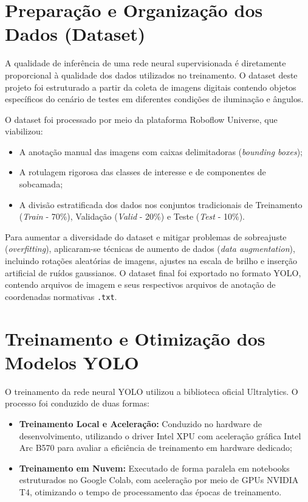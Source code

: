 \section{Preparação e Organização dos Dados (Dataset)}
A qualidade de inferência de uma rede neural supervisionada é diretamente proporcional à qualidade dos dados utilizados no treinamento. O dataset deste projeto foi estruturado a partir da coleta de imagens digitais contendo objetos específicos do cenário de testes em diferentes condições de iluminação e ângulos. 

O dataset foi processado por meio da plataforma Roboflow Universe, que viabilizou:
\begin{itemize}
    \item A anotação manual das imagens com caixas delimitadoras (\textit{bounding boxes});
    \item A rotulagem rigorosa das classes de interesse e de componentes de sobcamada;
    \item A divisão estratificada dos dados nos conjuntos tradicionais de Treinamento (\textit{Train} - 70\%), Validação (\textit{Valid} - 20\%) e Teste (\textit{Test} - 10\%).
\end{itemize}

Para aumentar a diversidade do dataset e mitigar problemas de sobreajuste (\textit{overfitting}), aplicaram-se técnicas de aumento de dados (\textit{data augmentation}), incluindo rotações aleatórias de imagens, ajustes na escala de brilho e inserção artificial de ruídos gaussianos. O dataset final foi exportado no formato YOLO, contendo arquivos de imagem e seus respectivos arquivos de anotação de coordenadas normativas \texttt{.txt}.

\section{Treinamento e Otimização dos Modelos YOLO}
O treinamento da rede neural YOLO utilizou a biblioteca oficial Ultralytics. O processo foi conduzido de duas formas:
\begin{itemize}
    \item \textbf{Treinamento Local e Aceleração:} Conduzido no hardware de desenvolvimento, utilizando o driver Intel XPU com aceleração gráfica Intel Arc B570 para avaliar a eficiência de treinamento em hardware dedicado;
    \item \textbf{Treinamento em Nuvem:} Executado de forma paralela em notebooks estruturados no Google Colab, com aceleração por meio de GPUs NVIDIA T4, otimizando o tempo de processamento das épocas de treinamento.
\end{itemize}

